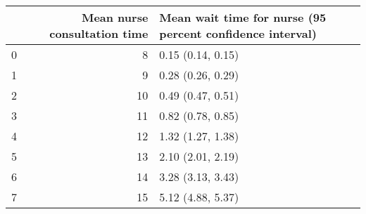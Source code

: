 \begin{tabular}{lrl}
\toprule
 & Mean nurse consultation time & Mean wait time for nurse (95 percent confidence interval) \\
\midrule
0 & 8 & 0.15 (0.14, 0.15) \\
1 & 9 & 0.28 (0.26, 0.29) \\
2 & 10 & 0.49 (0.47, 0.51) \\
3 & 11 & 0.82 (0.78, 0.85) \\
4 & 12 & 1.32 (1.27, 1.38) \\
5 & 13 & 2.10 (2.01, 2.19) \\
6 & 14 & 3.28 (3.13, 3.43) \\
7 & 15 & 5.12 (4.88, 5.37) \\
\bottomrule
\end{tabular}
